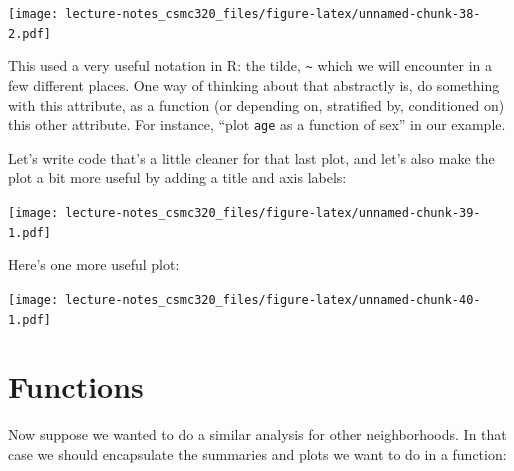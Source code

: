 \documentclass[12pt,]{book}
\newenvironment{Shaded}{\begin{snugshade}}{\end{snugshade}}
\newcommand{\KeywordTok}[1]{\textcolor[rgb]{0.13,0.29,0.53}{\textbf{#1}}}
\newcommand{\DataTypeTok}[1]{\textcolor[rgb]{0.13,0.29,0.53}{#1}}
\newcommand{\StringTok}[1]{\textcolor[rgb]{0.31,0.60,0.02}{#1}}
\newcommand{\OperatorTok}[1]{\textcolor[rgb]{0.81,0.36,0.00}{\textbf{#1}}}
\newcommand{\NormalTok}[1]{#1}
\theoremstyle{definition}
\theoremstyle{definition}
\theoremstyle{definition}
\theoremstyle{remark}
\begin{document}
\texttt{[image: lecture-notes\_csmc320\_files/figure-latex/unnamed-chunk-38-2.pdf]}

This used a very useful notation in R: the tilde,
\texttt{\textasciitilde{}} which we will encounter in a few different
places. One way of thinking about that abstractly is, do something with
this attribute, as a function (or depending on, stratified by,
conditioned on) this other attribute. For instance, ``plot \texttt{age}
as a function of sex'' in our example.

Let's write code that's a little cleaner for that last plot, and let's
also make the plot a bit more useful by adding a title and axis labels:

\begin{Shaded}
\end{Shaded}

\texttt{[image: lecture-notes\_csmc320\_files/figure-latex/unnamed-chunk-39-1.pdf]}

Here's one more useful plot:

\begin{Shaded}
\end{Shaded}

\texttt{[image: lecture-notes\_csmc320\_files/figure-latex/unnamed-chunk-40-1.pdf]}

\section{Functions}\label{functions}

Now suppose we wanted to do a similar analysis for other neighborhoods.
In that case we should encapsulate the summaries and plots we want to do
in a function:
\end{document}
